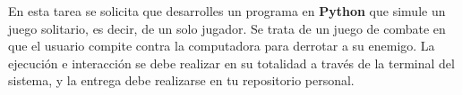 \label{sec:Resumen}

En esta tarea se solicita que desarrolles un programa en \textbf{Python} que simule un juego solitario, es decir, de un solo jugador. Se trata de un juego de combate en que el usuario compite contra la computadora para derrotar a su enemigo. La ejecuci\'on e interacci\'on se debe realizar en su totalidad a trav\'es de la terminal del sistema, y la entrega debe realizarse en tu repositorio personal.